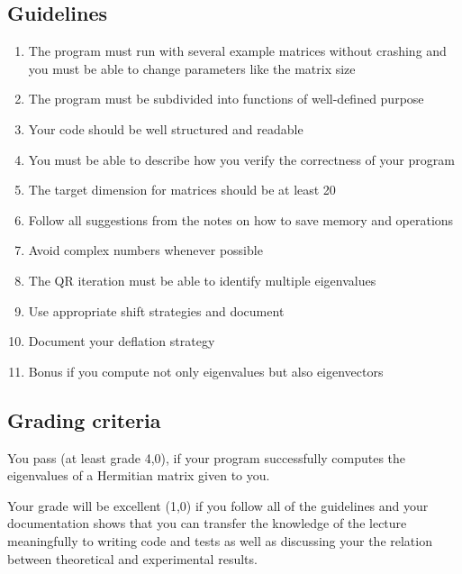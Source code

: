 \documentclass[a4paper]{article}
\begin{document}
\subsection*{Guidelines}
\begin{enumerate}
\item The program must run with several example matrices without
  crashing and you must be able to change parameters like the matrix
  size
\item The program must be subdivided into functions of well-defined
  purpose
\item Your code should be well structured and readable
\item You must be able to describe how you verify the correctness of
  your program
\item The target dimension for matrices should be at least 20
\item Follow all suggestions from the notes on how to save memory and operations
\item Avoid complex numbers whenever possible
\item The QR iteration must be able to identify multiple eigenvalues
\item Use appropriate shift strategies and document
\item Document your deflation strategy
\item Bonus if you compute not only eigenvalues but also eigenvectors
\end{enumerate}

\subsection*{Grading criteria}

You pass (at least grade 4,0), if your program successfully computes
the eigenvalues of a Hermitian matrix given to you.

Your grade will be excellent (1,0) if you follow all of the guidelines
and your documentation shows that you can transfer the knowledge of
the lecture meaningfully to writing code and tests as well as
discussing your the relation between theoretical and experimental
results.
\end{document}
